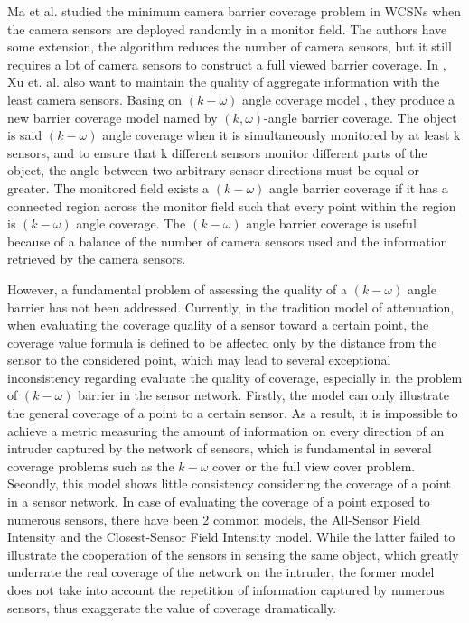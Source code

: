 \documentclass[3p]{elsarticle}
\begin{document}
Ma et al. \cite{ma2012minimum} studied the minimum camera barrier coverage problem in WCSNs when the camera sensors are deployed randomly in a monitor field. The authors have some extension, the algorithm reduces the number of camera sensors, but it still requires a lot of camera sensors to construct a full viewed barrier coverage. In \cite{xu2016minimum}, Xu et. al. also want to maintain the quality of aggregate information with the least camera sensors. Basing on $(k-\omega)$ angle coverage model \cite{tseng2012k}, they produce a new barrier coverage model named by $(k, \omega)$-angle barrier coverage. The object is said $(k-\omega)$ angle coverage when it is simultaneously monitored by at least k sensors, and to ensure that k different sensors monitor different parts of the object, the angle between two arbitrary sensor directions must be equal or greater. The monitored field exists a $(k-\omega)$ angle barrier coverage if it has a connected region across the monitor field such that every point within the region is $(k-\omega)$ angle coverage. The $(k-\omega)$ angle barrier coverage is useful because of a balance of the number of camera sensors used and the information retrieved by the camera sensors.\par
%
However, a fundamental problem of assessing the quality of a $(k-\omega)$ angle barrier has not been addressed. Currently, in the tradition model of attenuation, when evaluating the coverage quality of a sensor toward a certain point, the coverage value formula is defined to be affected only by the distance from the sensor to the considered point, which may lead to several exceptional inconsistency regarding evaluate the quality of coverage, especially in the problem of $(k-\omega)$ barrier in the sensor network. Firstly, the model can only illustrate the general coverage of a point to a certain sensor. As a result, it is impossible to achieve a metric measuring the amount of information on every direction of an intruder captured by the network of sensors, which is fundamental in several coverage problems such as the $k-\omega$ cover or the full view cover problem. Secondly, this model shows little consistency considering the coverage of a point in a sensor network. In case of evaluating the coverage of a point exposed to numerous sensors, there have been 2 common models, the All-Sensor Field Intensity and the Closest-Sensor Field Intensity model. While the latter failed to illustrate the cooperation of the sensors in sensing the same object, which greatly underrate the real coverage of the network on the intruder, the former model does not take into account the repetition of information captured by numerous sensors, thus exaggerate the value of coverage dramatically.\par
\end{document}

